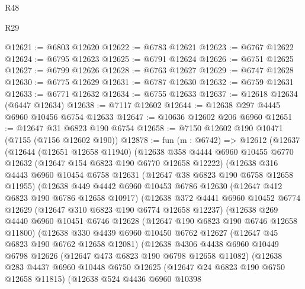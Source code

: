 \begin{lexlean}{R48}
\begin{lexlean}{R29}
\begin{coremodule}
{{{{{{{{{{{{{{{{{{{{{{{{{{{{{{{{{{{{{{{{{{{{{{{{{{{{{{{{{{{{{{{{{{{{{{{{{{{{{{{{{{{{{{{{{{{{{{{{{{{{{{{{{{{{{{{{{{{{{{{{{{{{{{{{{{{{{{{{{{{{{{{{{{{{{{{{{{{{{{{{{{{{{{{{{{{{{{{{{{{{{{{{{{{{{{{{{{{{{{{{{{{{{{{{{{{{{{{{{{@12621 := @6803 @12620
@12622 := @6783 @12621
@12623 := @6767 @12622
@12624 := @6795 @12623
@12625 := @6791 @12624
@12626 := @6751 @12625
@12627 := @6799 @12626
@12628 := @6763 @12627
@12629 := @6747 @12628
@12630 := @6775 @12629
@12631 := @6787 @12630
@12632 := @6759 @12631
@12633 := @6771 @12632
@12634 := @6755 @12633
@12637 := @12618 @12634 (@6447 @12634)
@12638 := @7117 @12602
@12644 := @12638 @297 @4445 @6960 @10456 @6754 @12633
@12647 := @10636 @12602 @206 @6960
@12651 := @12647 @31 @6823 @190 @6754
@12658 := @7150 @12602 @190 @10471 (@7155 (@7156 @12602 @190))
@12878 := fun (m : @6742) =>
  @12612
    (@12637
      (@12644
        (@12651 @12658 @11940)
        (@12638
          @358
          @4444
          @6960
          @10455
          @6770
          @12632
          (@12647 @154 @6823 @190 @6770 @12658 @12222)
          (@12638
            @316
            @4443
            @6960
            @10454
            @6758
            @12631
            (@12647 @38 @6823 @190 @6758 @12658 @11955)
            (@12638
              @449
              @4442
              @6960
              @10453
              @6786
              @12630
              (@12647 @412 @6823 @190 @6786 @12658 @10917)
              (@12638
                @372
                @4441
                @6960
                @10452
                @6774
                @12629
                (@12647 @310 @6823 @190 @6774 @12658 @12237)
                (@12638
                  @269
                  @4440
                  @6960
                  @10451
                  @6746
                  @12628
                  (@12647 @190 @6823 @190 @6746 @12658 @11800)
                  (@12638
                    @330
                    @4439
                    @6960
                    @10450
                    @6762
                    @12627
                    (@12647 @45 @6823 @190 @6762 @12658 @12081)
                    (@12638
                      @4306
                      @4438
                      @6960
                      @10449
                      @6798
                      @12626
                      (@12647 @473 @6823 @190 @6798 @12658 @11082)
                      (@12638
                        @283
                        @4437
                        @6960
                        @10448
                        @6750
                        @12625
                        (@12647 @24 @6823 @190 @6750 @12658 @11815)
                        (@12638
                          @524
                          @4436
                          @6960
                          @10398
}}}}}}}}}}}}}}}}}}}}}}}}}}}}}}}}}}}}}}}}}}}}}}}}}}}}}}}}}}}}}}}}}}}}}}}}}}}}}}}}}}}}}}}}}}}}}}}}}}}}}}}}}}}}}}}}}}}}}}}}}}}}}}}}}}}}}}}}}}}}}}}}}}}}}}}}}}}}}}}}}}}}}}}}}}}}}}}}}}}}}}}}}}}}}}}}}}}}}}}}}}}}}}}}}}}}}}}}}}
\end{coremodule}
\end{lexlean}
\end{lexlean}
